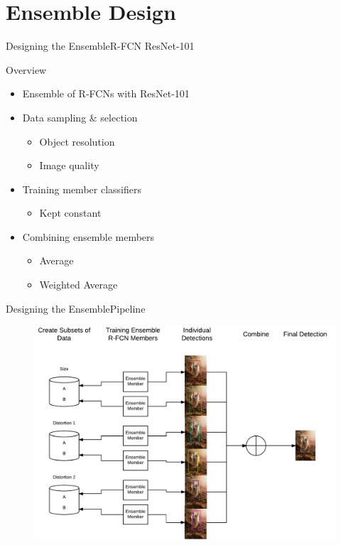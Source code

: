 \section{Ensemble Design}
\begin{frame}{Designing the Ensemble}{R-FCN ResNet-101}
    \begin{block}{Overview}
    \begin{itemize}
        \item Ensemble of R-FCNs with ResNet-101
        \item Data sampling \& selection
        \begin{itemize}
            \item Object resolution
            \item Image quality
        \end{itemize}
        \item Training member classifiers
        \begin{itemize}
            \item Kept constant
        \end{itemize}
        \item Combining ensemble members
        \begin{itemize}
            \item Average
            \item Weighted Average
        \end{itemize}       
    \end{itemize}
\end{block}
\end{frame}

\begin{frame}{Designing the Ensemble}{Pipeline}
    \begin{figure}
        \includegraphics[width=0.8 \textwidth]{figs/ensembledesign.pdf}
    \end{figure}
\end{frame}

